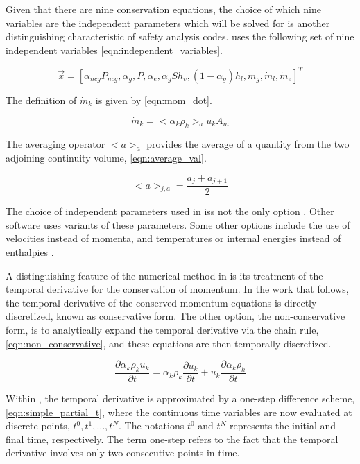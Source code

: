 Given that there are nine conservation equations, the choice of which nine variables are the independent parameters which will be solved for is another distinguishing characteristic of safety analysis codes.
\cobra{} uses the following set of nine independent variables \eqref{eqn:independent_variables}.

\begin{equation}
\label{eqn:independent_variables}
\vec{x} = [\alpha_{ncg}P_{ncg}, \alpha_g, P, \alpha_e, \alpha_gS h_v, (1 - \alpha_g) h_l, \dot{m}_g, \dot{m}_l, \dot{m}_e]^{T}
\end{equation}

The definition of $\dot{m}_k$ is given by \eqref{eqn:mom_dot}.

\begin{equation}
\label{eqn:mom_dot}
\dot{m}_{k} = <\alpha_k \rho_k>_{a} u_{k} A_{m}
\end{equation}

The averaging operator $<a>_{a}$ provides the average of a quantity from the two adjoining continuity volume, \eqref{eqn:average_val}.

\begin{equation}
\label{eqn:average_val}
<a>_{j,a} = \frac{a_{j} + a_{j+1}}{2}
\end{equation}

The choice of independent parameters used in \cobra{} iss not the only option .
Other software uses variants of these parameters.
Some other options include the use of velocities instead of momenta, and temperatures or internal energies instead of enthalpies \cite{RELAP, TRACE}.

A distinguishing feature of the numerical method in \cobra{} is its treatment of the temporal derivative for the conservation of momentum.
In the work that follows, the temporal derivative of the conserved momentum equations is directly discretized, known as conservative form.
The other option, the non-conservative form, is to analytically expand the temporal derivative via the chain rule, \eqref{eqn:non_conservative}, and these equations are then temporally discretized.

\begin{equation}
\label{eqn:non_conservative}
\frac{\partial \alpha_k \rho_k u_k}{\partial t} = \alpha_k \rho_k \frac{\partial u_k}{\partial t} + u_k \frac{\partial \alpha_k \rho_k}{\partial t}
\end{equation}

Within \cobra{}, the temporal derivative is approximated by a one-step difference scheme, \eqref{eqn:simple_partial_t}, where the continuous time variables are now evaluated at discrete points, $t^0, t^1, \ldots, t^N$.
The notations $t^0$ and $t^N$ represents the initial and final time, respectively.
The term one-step refers to the fact that the temporal derivative involves only two consecutive points in time.

